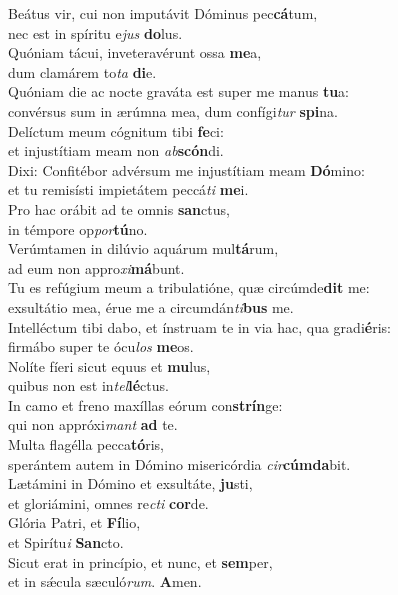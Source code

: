 \evenverse Beátus vir, cui non imputávit Dóminus pec\textbf{cá}tum,~\*\\
\evenverse nec est in spíritu e\textit{jus} \textbf{do}lus.\\
\oddverse Quóniam tácui, inveteravérunt ossa \textbf{me}a,~\*\\
\oddverse dum clamárem to\textit{ta} \textbf{di}e.\\
\evenverse Quóniam die ac nocte graváta est super me manus \textbf{tu}a:~\*\\
\evenverse convérsus sum in ærúmna mea, dum confígi\textit{tur} \textbf{spi}na.\\
\oddverse Delíctum meum cógnitum tibi \textbf{fe}ci:~\*\\
\oddverse et injustítiam meam non \textit{ab}\textbf{scón}di.\\
\evenverse Dixi: Confitébor advérsum me injustítiam meam \textbf{Dó}mino:~\*\\
\evenverse et tu remisísti impietátem peccá\textit{ti} \textbf{me}i.\\
\oddverse Pro hac orábit ad te omnis \textbf{san}ctus,~\*\\
\oddverse in témpore op\textit{por}\textbf{tú}no.\\
\evenverse Verúmtamen in dilúvio aquárum mul\textbf{tá}rum,~\*\\
\evenverse ad eum non appro\textit{xi}\textbf{má}bunt.\\
\oddverse Tu es refúgium meum a tribulatióne, quæ circúmde\textbf{dit} me:~\*\\
\oddverse exsultátio mea, érue me a circumdán\textit{ti}\textbf{bus} me.\\
\evenverse Intelléctum tibi dabo, et ínstruam te in via hac, qua gradi\textbf{é}ris:~\*\\
\evenverse firmábo super te ócu\textit{los} \textbf{me}os.\\
\oddverse Nolíte fíeri sicut equus et \textbf{mu}lus,~\*\\
\oddverse quibus non est in\textit{tel}\textbf{lé}ctus.\\
\evenverse In camo et freno maxíllas eórum con\textbf{strín}ge:~\*\\
\evenverse qui non appróxi\textit{mant} \textbf{ad} te.\\
\oddverse Multa flagélla pecca\textbf{tó}ris,~\*\\
\oddverse sperántem autem in Dómino misericórdia \textit{cir}\textbf{cúm}\textbf{da}bit.\\
\evenverse Lætámini in Dómino et exsultáte, \textbf{ju}sti,~\*\\
\evenverse et gloriámini, omnes re\textit{cti} \textbf{cor}de.\\
\oddverse Glória Patri, et \textbf{Fí}lio,~\*\\
\oddverse et Spirítu\textit{i} \textbf{San}cto.\\
\evenverse Sicut erat in princípio, et nunc, et \textbf{sem}per,~\*\\
\evenverse et in sǽcula sæculó\textit{rum}. \textbf{A}men.\\
